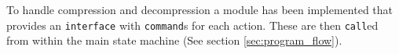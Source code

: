 
To handle compression and decompression a module has been implemented that provides an \texttt{interface} with \texttt{command}s for each action.
These are then \texttt{call}ed from within the main state machine (See section \ref{sec:program_flow}).



